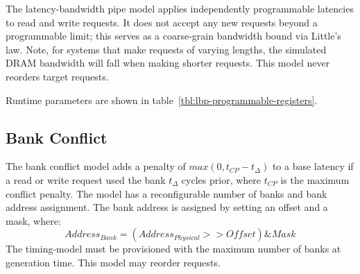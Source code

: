 The latency-bandwidth pipe model applies independently programmable latencies
to read and write requests. It does not accept any new requests beyond a
programmable limit; this serves as a coarse-grain bandwidth bound via Little's
law. Note, for systems that make requests of varying lengths, the simulated
DRAM bandwidth will fall when making shorter requests. This model never
reorders target requests.

\noindent Runtime parameters are shown in table~\ref{tbl:lbp-programmable-registers}.

\begin{table}
\begin{center}
\end{center}
\caption{Programmable registers of the latency-bandwidth pipe.}
\label{tbl:lbp-programmable-registers}
\end{table}%

\clearpage
\subsection{Bank Conflict}\label{sec:bank-conflict}

The bank conflict model adds a penalty of $max(0, t_{CP} - t_{\Delta})$ to a
base latency if a read or write request used the bank $t_{\Delta}$ cycles
prior, where $t_{CP}$ is the maximum conflict penalty. The model has a
reconfigurable number of banks and bank address assignment.  The bank address
is assigned by setting an offset and a mask, where: $$Address_{Bank} =
(Address_{Physical} >> Offset) \& Mask$$  The timing-model must be provisioned
with the maximum number of banks at generation time. This model may reorder requests.

